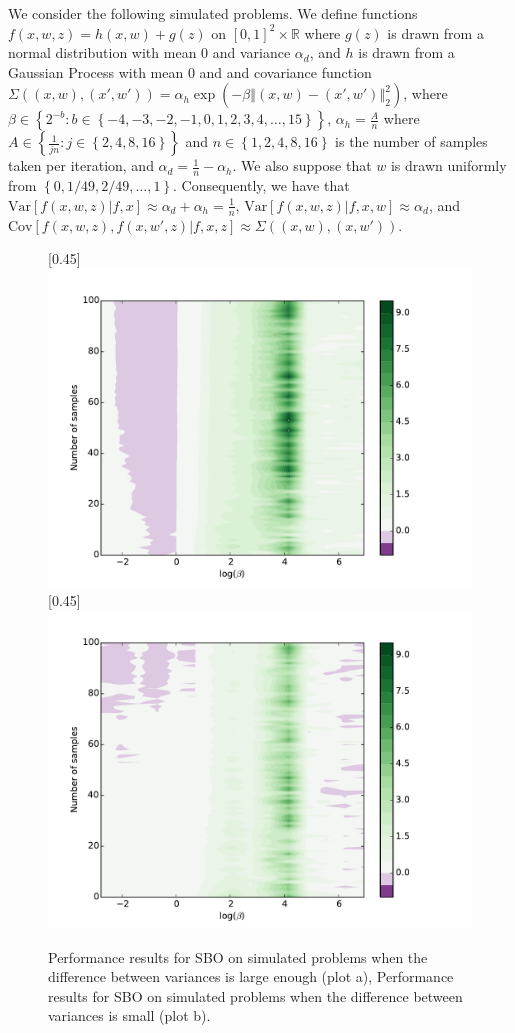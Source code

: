 \documentclass{article}
\newcommand{\w}{w}
\newcommand{\z}{z}
\begin{document}
We consider the following simulated problems. We define functions $f(x,\w,\z)=h(x,\w)+g(\z)$ on $\left[0,1\right]^{2}\times\mathbb{R}$ where $g(z)$ is drawn from a normal distribution with mean $0$ and variance $\alpha_{d}$, and $h$ is drawn from a Gaussian Process with mean $0$ and and covariance function $\Sigma\left(\left(x,\w\right),\left(x',\w'\right)\right)=\alpha_{h}\exp\left(-\beta\left\Vert \left(x,\w\right)-\left(x',\w'\right)\right\Vert _{2}^{2}\right)$, where $\beta\in\left\{ 2^{-b}:b\in\left\{ -4,-3,-2,-1,0,1,2,3,4,\ldots,15\right\} \right\} $, $\alpha_{h}=\frac{A}{n}$ where $A\in\left\{ \frac{1}{jn}:j\in\left\{ 2,4,8,16\right\} \right\} $ and $n\in\left\{ 1,2,4,8,16\right\} $ is the number of samples taken per iteration, and $\alpha_{d}=\frac{1}{n}-\alpha_{h}$. We also suppose that 
$\w$ is drawn uniformly from $\left\{ 0,1/49,2/49,\ldots,1\right\} $. Consequently, we have that $\mbox{Var}\left[f\left(x,\w,\z\right)|f,x\right]\approx\alpha_{d}+\alpha_{h}=\frac{1}{n}$, $\mbox{Var}\left[f\left(x,\w,\z\right)|f,x,\w\right]\approx\alpha_{d}$, and $\mbox{Cov}\left[f\left(x,\w,\z\right),f\left(x,\w',\z\right)|f,x,z\right]\approx\Sigma\left(\left(x,\w\right),\left(x,\w'\right)\right)$.


\begin{figure}[!htb]
    \centering
{}[0.45\linewidth]{
    \includegraphics[width=0.45\linewidth]{contourPlotbetahN1A2ver2.pdf}}
    \quad
    [0.45\linewidth]{
      \includegraphics[width=0.45\linewidth]{contourPlotbetahN8A2ver2.pdf}}
\caption{Performance results for SBO on simulated problems when the difference between variances is large enough  (plot a), Performance results for SBO on simulated problems when the difference between variances is small  (plot b).
    \label{fig:simulated}}
\end{figure}
\end{document}
